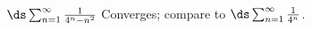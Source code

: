 {$\ds \sum_{n=1}^\infty \frac{1}{4^n-n^2}$
}
{Converges; compare to $\ds \sum_{n=1}^\infty \frac 1{4^n}$.
}